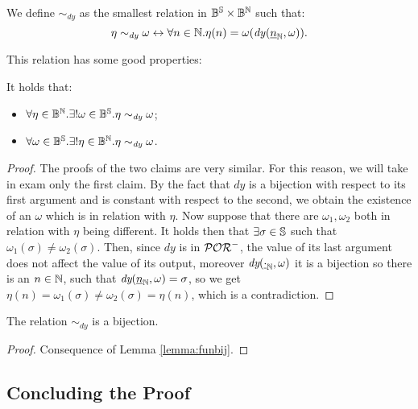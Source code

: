 \begin{defn}
  We define $\sim_{\mathit{dy}}$ as the smallest relation in
   $\mathbb{B}^{\mathbb{S}}\times \mathbb{B}^{\mathbb{N}}$ such that:
   $$
   \eta \sim_\mathit{dy} \omega \leftrightarrow \forall n \in \mathbb{N}.
    \eta(n)= \omega (\mathit{dy}({\underline{n}}_{\mathbb{N}}, \omega)).
   $$
\end{defn}

\noindent
This relation has some good properties:

\begin{lemma}
  \label{lemma:funbij}
  It holds that:
  \begin{itemize}
    \item $\forall \eta \in \mathbb{B}^{\mathbb{N}}. \exists ! \omega \in \mathbb{B}^{\mathbb{S}}. \eta \sim_{\mathit{dy}} \omega$;
    \item $\forall \omega \in \mathbb{B}^{\mathbb{S}}. \exists ! \eta \in \mathbb{B}^{\mathbb{N}}. \eta \sim_{\mathit{dy}} \omega$.
  \end{itemize}
\end{lemma}
\begin{proof}
  The proofs of the two claims are very similar.
  For this reason, we will take in exam only the first claim.
  By the fact that $\mathit{dy}$ is a bijection with respect to its
  first argument and is constant with respect to the second,
  we obtain the existence of an $\omega$ which is in relation with $\eta$.
  Now suppose that there are $\omega_1, \omega_2$ both in relation with $\eta$
  being different. It holds then that $\exists \sigma \in\mathbb{S}$ such that
  $\omega_1(\sigma)\neq\omega_2(\sigma)$. Then, since $\mathit{dy}$ is in $\mathcal{POR}^-$,
  the value of its last argument does not affect the value of its output,
  moreover $\emph{dy}({\underline{\cdot}}_{\mathbb{N}}, \omega)$ it is a bijection so
  there is an $n\in \mathbb{N}$, such that $\emph{dy}({\underline{n}}_{\mathbb{N}}, \omega)=\sigma$,
  so we get $\eta(n)=\omega_1(\sigma)\neq \omega_2(\sigma)=\eta(n)$,
  which is a contradiction.
\end{proof}
\begin{cor}
  The relation $\sim_{\mathit{dy}}$ is a bijection.
\end{cor}

\begin{proof}
  Consequence of Lemma \ref{lemma:funbij}.
\end{proof}









\subsection{Concluding the Proof}\label{sec:conclsfp-por}



